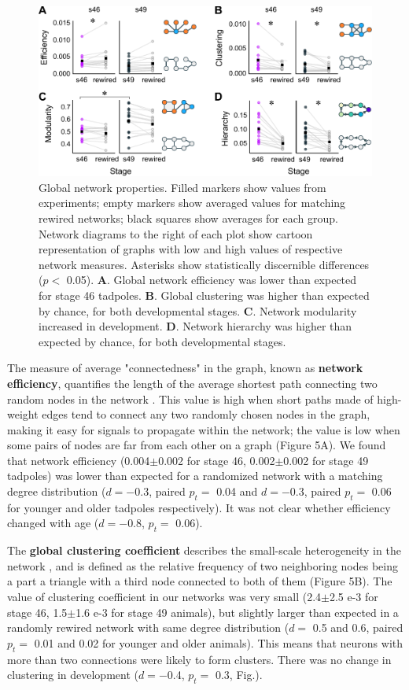 \documentclass{article}
\begin{document}
\begin{figure}[t!]
\includegraphics[width=\linewidth]{fig5.pdf}
\caption{
Global network properties. Filled markers show values from experiments; empty markers show averaged values for matching rewired networks; black squares show averages for each group. Network diagrams to the right of each plot show cartoon representation of graphs with low and high values of respective network measures. Asterisks show statistically discernible differences ($p<$ 0.05). \textbf{A}. Global network efficiency was lower than expected for stage 46 tadpoles. \textbf{B}. Global clustering was higher than expected by chance, for both developmental stages. \textbf{C}. Network modularity increased in development.  \textbf{D}. Network hierarchy was higher than expected by chance, for both developmental stages. }
\end{figure}

The measure of average "connectedness" in the graph, known as \textbf{network efficiency}, quantifies the length of the average shortest path connecting two random nodes in the network \citep{latora2001efficiency, rubinov2010toolbox}. This value is high when short paths made of high-weight edges tend to connect any two randomly chosen nodes in the graph, making it easy for signals to propagate within the network; the value is low when some pairs of nodes are far from each other on a graph (Figure 5A). We found that network efficiency (0.004$\pm$0.002 for stage 46, 0.002$\pm$0.002 for stage 49 tadpoles) was lower than expected for a randomized network with a matching degree distribution ($d=-$0.3, paired $p_t=$ 0.04 and $d=-$0.3, paired $p_t=$ 0.06 for younger and older tadpoles respectively). It was not clear whether efficiency changed with age ($d=-$0.8, $p_t=$ 0.06).

The \textbf{global clustering coefficient} describes the small-scale heterogeneity in the network \citep{fagiolo2007}, and is defined as the relative frequency of two neighboring nodes being a part a triangle with a third node connected to both of them (Figure 5B). The value of clustering coefficient in our networks was very small (2.4$\pm$2.5 e-3 for stage 46, 1.5$\pm$1.6 e-3 for stage 49 animals), but slightly larger than expected in a randomly rewired network with same degree distribution ($d=$ 0.5 and 0.6, paired $p_t=$ 0.01 and 0.02 for younger and older animals). This means that neurons with more than two connections were likely to form clusters. There was no change in clustering in development ($d=-$0.4, $p_t=$ 0.3, Fig.).
\end{document}
